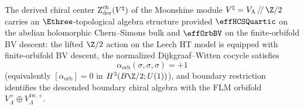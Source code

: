 \begin{theorem}
\label{thm:monster-orbifold-e3}
The derived chiral center $\operatorname{Z}_{\mathrm{der}}^{\mathrm{ch}}(V^\natural)$
of the Moonshine module
$V^\natural = V_\Lambda \,/\!/\, \Z/2$ carries an
$\Ethree$-topological algebra structure provided $\effHCSQuartic$
on the abelian holomorphic Chern--Simons bulk and $\effOrbBV$ on the
finite-orbifold BV descent: the lifted
$\Z/2$ action on the Leech HT model is equipped with
finite-orbifold BV descent, the normalized Dijkgraaf--Witten
cocycle satisfies
\[
\alpha_{\mathrm{orb}}(\sigma,\sigma,\sigma)=+1
\]
\textup{(}equivalently
$[\alpha_{\mathrm{orb}}]=0$ in
$H^3(B\Z/2;U(1))$\textup{)}, and boundary restriction identifies
the descended boundary chiral algebra with the FLM orbifold
$V_\Lambda^+\oplus V_\Lambda^{\mathrm{tw},+}$.
\end{theorem}

